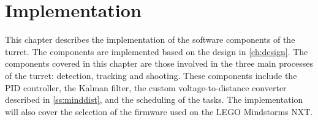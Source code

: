 \chapter{Implementation}\label{ch:implementation}
This chapter describes the implementation of the software components of the turret. The components are implemented based on the design in \cref{ch:design}. The components covered in this chapter are those involved in the three main processes of the turret: detection, tracking and shooting. These components include the PID controller, the Kalman filter, the custom voltage-to-distance converter described in \cref{ss:minddist}, and the scheduling of the tasks. The implementation will also cover the selection of the firmware used on the LEGO Mindstorms NXT.









